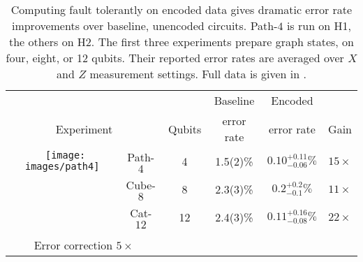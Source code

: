 \documentclass[10pt, twocolumn, aps, nofootinbib, longbibliography, nobibnotes, superscriptaddress]{revtex4-1} %
\begin{document}
\begin{table}
\caption{\label{f:experiments_summary}
Computing fault tolerantly on encoded data gives dramatic error rate improvements over baseline, unencoded circuits.  Path-$4$ is run on H1, the others on H2.  
The first three experiments prepare graph states, on four, eight, or 12 qubits.  %
Their reported error rates are averaged over $X$ and $Z$ measurement settings.  %
Full data is given in .  
}
\setlength{\tabcolsep}{1.9pt}
\begin{tabular}{c@{$\!\!\!\!\!\!\!\!\!\!$}cc@{$\,\,\,\,$}c@{$\,\,\,\,$}c@{$\,\,\,\,$}c}
\Xhline{2\arrayrulewidth}
& && Baseline & Encoded & %
 \\[-.1cm]
\multicolumn{2}{c}{Experiment} & $\!\!\!$Qubits$\!$
& error rate & error rate & Gain \\
\hline
{$\;\;$\texttt{[image: images/path4]}} & Path-$4$ & 4 & 
1.5(2)\% %
& $0.10^{+0.11}_{-0.06}\%$ & $15 \times$ \\
{$\;\;$\raisebox{-.1cm}{\texttt{[image: images/cube8]}}} & Cube-$8$ & 8 & %
2.3(3)\% %
& $0.2^{+0.2}_{-0.1}\%$ & $11 \times$ \\
$\;\;$\raisebox{.05cm}{\scalebox{.5}{$\ket{0^{12}} + \ket{1^{12}}$}} & Cat-$12$ & 12 & 
2.4(3)\% %
& $0.11^{+0.16}_{-0.08}\%$ & $22 \times$ \\[.1 cm]
\hline \\[-.35cm]
\multicolumn{2}{c}{Error correction $5 \times$}

\end{tabular}
\end{table}
\end{document}
